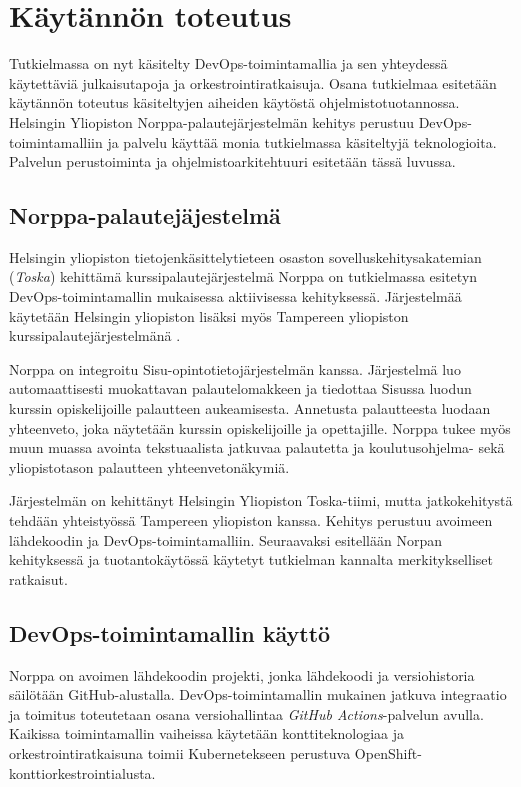 \chapter{Käytännön toteutus\label{example}}

Tutkielmassa on nyt käsitelty DevOps-toimintamallia ja sen yhteydessä käytettäviä julkaisutapoja ja orkestrointiratkaisuja.
Osana tutkielmaa esitetään käytännön toteutus käsiteltyjen aiheiden käytöstä ohjelmistotuotannossa.
Helsingin Yliopiston Norppa-palautejärjestelmän kehitys perustuu DevOps-toimintamalliin ja palvelu käyttää monia tutkielmassa käsiteltyjä teknologioita.
Palvelun perustoiminta ja ohjelmistoarkitehtuuri esitetään tässä luvussa.

\section{Norppa-palautejäjestelmä}

Helsingin yliopiston tietojenkäsittelytieteen osaston sovelluskehitysakatemian (\textit{Toska}) \cite{Tenhunen23} kehittämä kurssipalautejärjestelmä Norppa on tutkielmassa esitetyn DevOps-toimintamallin mukaisessa aktiivisessa kehityksessä.
Järjestelmää käytetään Helsingin yliopiston lisäksi myös Tampereen yliopiston kurssipalautejärjestelmänä \cite{Tampere23}.

Norppa on integroitu Sisu-opintotietojärjestelmän kanssa.
Järjestelmä luo automaattisesti muokattavan palautelomakkeen ja tiedottaa Sisussa luodun kurssin opiskelijoille palautteen aukeamisesta.
Annetusta palautteesta luodaan yhteenveto, joka näytetään kurssin opiskelijoille ja opettajille.
Norppa tukee myös muun muassa avointa tekstuaalista jatkuvaa palautetta ja koulutusohjelma- sekä yliopistotason palautteen yhteenvetonäkymiä.

Järjestelmän on kehittänyt Helsingin Yliopiston Toska-tiimi, mutta jatkokehitystä tehdään yhteistyössä Tampereen yliopiston kanssa.
Kehitys perustuu avoimeen lähdekoodin ja DevOps-toimintamalliin.
Seuraavaksi esitellään Norpan kehityksessä ja tuotantokäytössä käytetyt tutkielman kannalta merkitykselliset ratkaisut.

\section{DevOps-toimintamallin käyttö}

Norppa on avoimen lähdekoodin projekti, jonka lähdekoodi ja versiohistoria säilötään GitHub-alustalla.
DevOps-toimintamallin mukainen jatkuva integraatio ja toimitus toteutetaan osana versiohallintaa \textit{GitHub Actions}-palvelun avulla.
Kaikissa toimintamallin vaiheissa käytetään konttiteknologiaa ja orkestrointiratkaisuna toimii Kubernetekseen perustuva OpenShift-konttiorkestrointialusta.

